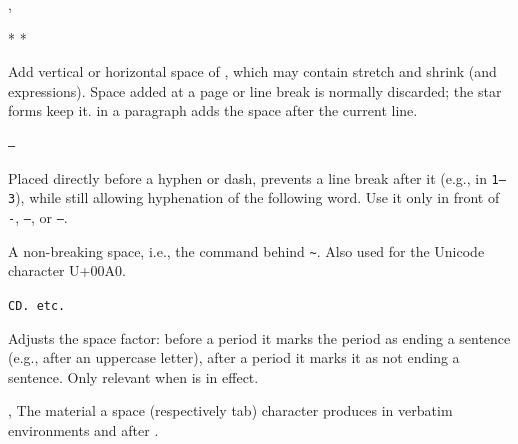 \documentclass{l3in2edoc}
\begin{document}
\begin{function}[user]
  {
    \vspace,
    \hspace
  }
  \begin{syntax}
     * 
     * 
  \end{syntax}
  Add vertical or horizontal space of , which may contain
  stretch and shrink (and  expressions). Space added at a
  page or line break is normally discarded; the star forms keep it.
   in a paragraph adds the space after the current line.
\end{function}


\begin{function}[user]
  {
    \nobreakdashes
  }
  \begin{syntax}
    \texttt{--}
  \end{syntax}
  Placed directly before a hyphen or dash, prevents a line break after
  it (e.g., in \texttt{1}\texttt{--3}), while still
  allowing hyphenation of the following word. Use it only in front of
  \texttt{-}, \texttt{--}, or \texttt{---}.
\end{function}


\begin{function}[user]
  {
    \nobreakspace
  }
  \begin{syntax}
  \end{syntax}
  A non-breaking space, i.e., the command behind \texttt{\textasciitilde}.
  Also used for the Unicode character U+00A0.
\end{function}


\begin{function}[user]
  {
    \@
  }
  \begin{syntax}
    \texttt{CD}\texttt{. etc.}
  \end{syntax}
  Adjusts the space factor: before a period it marks the period as
  ending a sentence (e.g., after an uppercase letter), after a period
  it marks it as not ending a sentence. Only relevant when
   is in effect.
\end{function}




\begin{function}[int]
  {
    \@xobeysp,
    \@xobeytab
  }
  The material a space (respectively tab) character produces in
  verbatim environments and after .
\end{function}
\end{document}
